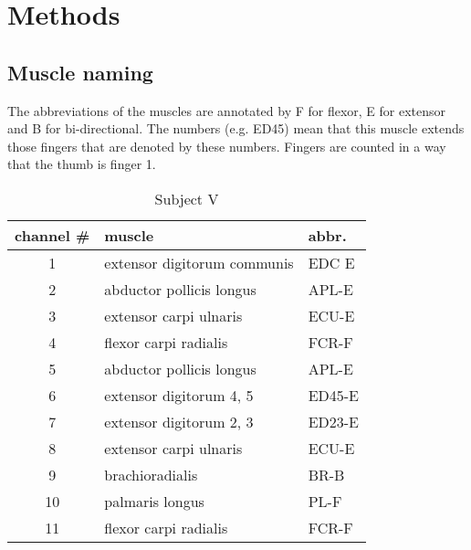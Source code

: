 \appendix


\section{Methods} %

\subsection{Muscle naming} %
\label{ap:sub:muscle_naming}

The abbreviations of the muscles are annotated by F for flexor, E for extensor and B for bi-directional. The numbers (e.g. ED45) mean that this muscle extends those fingers that are denoted by these numbers. Fingers are counted in a way that the thumb is finger 1.


\begin{table}[h]
 	\centering
	\small
 	\begin{tabular}{cll}
		\toprule
			channel \# & muscle & abbr. \\
			\toprule
			1  &	extensor digitorum communis &	EDC E\\
			2  &  	abductor pollicis longus 	&	APL-E\\
			3  &	extensor carpi ulnaris 		&	ECU-E\\
			4  &	flexor carpi radialis 		&	FCR-F\\
			5  &	abductor pollicis longus 	&	APL-E\\
			6  &	extensor digitorum 4, 5 	&	ED45-E\\
			7  &	extensor digitorum 2, 3 	&	ED23-E\\
			8  &	extensor carpi ulnaris 		&	ECU-E\\
			9  &	brachioradialis 			&	BR-B\\
			10 & 	palmaris longus 			&	PL-F\\
			11 & 	flexor carpi radialis 		&	FCR-F\\
		\bottomrule
 	\end{tabular}
 	\caption{Subject V}
 	\label{app:tab:muscle_naming}
\end{table}


